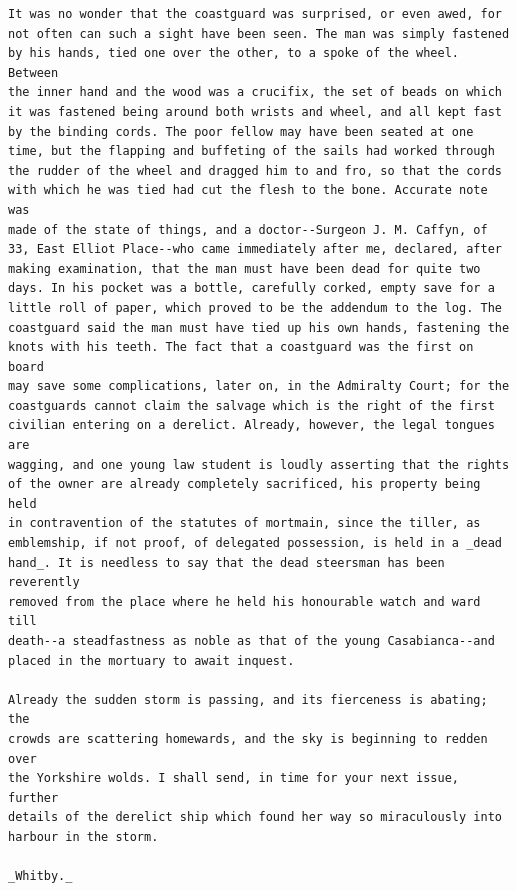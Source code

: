 \documentclass{article}
\begin{document}
\begin{verbatim}
It was no wonder that the coastguard was surprised, or even awed, for
not often can such a sight have been seen. The man was simply fastened
by his hands, tied one over the other, to a spoke of the wheel. Between
the inner hand and the wood was a crucifix, the set of beads on which
it was fastened being around both wrists and wheel, and all kept fast
by the binding cords. The poor fellow may have been seated at one
time, but the flapping and buffeting of the sails had worked through
the rudder of the wheel and dragged him to and fro, so that the cords
with which he was tied had cut the flesh to the bone. Accurate note was
made of the state of things, and a doctor--Surgeon J. M. Caffyn, of
33, East Elliot Place--who came immediately after me, declared, after
making examination, that the man must have been dead for quite two
days. In his pocket was a bottle, carefully corked, empty save for a
little roll of paper, which proved to be the addendum to the log. The
coastguard said the man must have tied up his own hands, fastening the
knots with his teeth. The fact that a coastguard was the first on board
may save some complications, later on, in the Admiralty Court; for the
coastguards cannot claim the salvage which is the right of the first
civilian entering on a derelict. Already, however, the legal tongues are
wagging, and one young law student is loudly asserting that the rights
of the owner are already completely sacrificed, his property being held
in contravention of the statutes of mortmain, since the tiller, as
emblemship, if not proof, of delegated possession, is held in a _dead
hand_. It is needless to say that the dead steersman has been reverently
removed from the place where he held his honourable watch and ward till
death--a steadfastness as noble as that of the young Casabianca--and
placed in the mortuary to await inquest.

Already the sudden storm is passing, and its fierceness is abating; the
crowds are scattering homewards, and the sky is beginning to redden over
the Yorkshire wolds. I shall send, in time for your next issue, further
details of the derelict ship which found her way so miraculously into
harbour in the storm.

_Whitby._


\end{verbatim}
\end{document}
